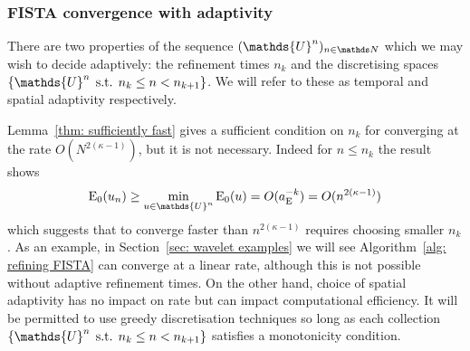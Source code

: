\documentclass[smallextended]{svjour3}
\let\F\mathds\let\C\mathcal\newcommand{\R}{\F{R}}\newcommand{\A}{\tens{A}}
\newcommand{\op}[1]{\operatorname{#1}}
\newcommand{\1}{\F{1}}
\DeclareMathOperator{\st}{\;s.t.\;}
\newcommand*{\varf}[1]{%
	\IfEqCase{#1}{%
		{0}{u}%
		{1}{v}%
		{2}{w}%
	}[u#1]%
}
\newcommand*{\spcf}[1]{%
	\IfEqCase{#1}{%
		{0}{\F{U}}%
		{1}{\F{V}}%
		{2}{\F{W}}%
	}[\F{U}#1]%
}
\newcommand*{\vars}[1]{%
	\IfEqCase{#1}{%
		{0}{\alpha}%
		{1}{\beta}%
		{2}{\gamma}%
		{3}{a}%
		{4}{b}%
		{5}{c}%
	}[k#1]%
}
\begin{document}
	
	\subsubsection{FISTA convergence with adaptivity}
	There are two properties of the sequence $(\spcf0^n)_{n\in\F N}$ which we may wish to decide adaptively: the refinement times $n_k$ and the discretising spaces $\{\spcf0^n \st n_k\leq n<n_{k+1}\}$. We will refer to these as temporal and spatial adaptivity respectively.
	
	Lemma~\ref{thm: sufficiently fast} gives a sufficient condition on $n_k$ for converging at the rate $O(N^{2(\kappa-1)})$, but it is not necessary. Indeed for $n\leq n_k$ the result shows 
	$$\op{E}_0(\varf0_n) \geq \min_{\varf0\in\spcf0^n}\op{E}_0(\varf0) = O(\vars3_{\op{E}}^{-k}) = O(n^{2(\kappa-1)})$$
	which suggests that to converge faster than $n^{2(\kappa-1)}$ requires choosing smaller $n_k$. As an example, in Section~\ref{sec: wavelet examples} we will see Algorithm~\ref{alg: refining FISTA} can converge at a linear rate, although this is not possible without adaptive refinement times. On the other hand, choice of spatial adaptivity has no impact on rate but can impact computational efficiency. It will be permitted to use greedy discretisation techniques so long as each collection $\{\spcf0^n \st n_k\leq n<n_{k+1}\}$ satisfies a monotonicity condition.
	
\end{document}
